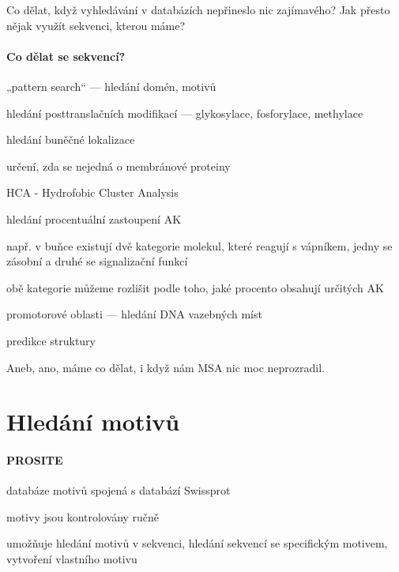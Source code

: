 \documentclass[DIV=8]{scrreprt}
\begin{document}
Co dělat, když vyhledávání v databázích nepřineslo nic zajímavého? Jak přesto nějak využít sekvenci, kterou máme?

\paragraph{Co dělat se sekvencí?}
\begin{myItemize}[nosep]
    \item „pattern search“ --- hledání domén, motivů
    \item hledání posttranslačních modifikací --- glykosylace, fosforylace, methylace
    \item hledání buněčné lokalizace
    \item určení, zda se nejedná o membránové proteiny
    \item HCA - Hydrofobic Cluster Analysis
    \item hledání procentuální zastoupení AK
\begin{myItemize}[nosep]
    \item např. v buňce existují dvě kategorie molekul, které reagují s vápníkem, jedny se zásobní a druhé se signalizační funkcí
    \item obě kategorie můžeme rozlišit podle toho, jaké procento obsahují určitých AK
\end{myItemize}

    \item promotorové oblasti --- hledání DNA vazebných míst
    \item predikce struktury
\end{myItemize}



Aneb, ano, máme co dělat, i když nám MSA nic moc neprozradil.

\section{Hledání motivů} \label{Hledání motivů} \FloatBarrier


\paragraph{PROSITE}
\begin{myItemize}[nosep]
    \item databáze motivů spojená s databází Swissprot
    \item motivy jsou kontrolovány ručně
    \item umožňuje hledání motivů v sekvenci, hledání sekvencí se specifickým motivem, vytvoření vlastního motivu
\end{myItemize}
\end{document}

